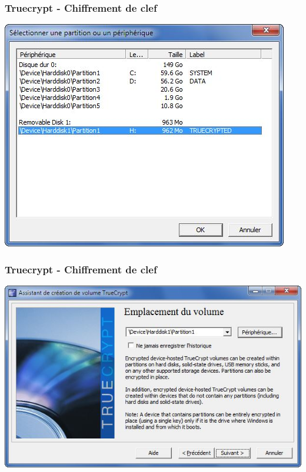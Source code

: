 \documentclass{beamer}
\begin{document}
\begin{frame}
\frametitle{Truecrypt - Chiffrement de clef}
\begin{center}
\includegraphics[scale=0.5] {./images/Truecrypt26.jpg} 
\end{center}
\end{frame}
\begin{frame}
\frametitle{Truecrypt - Chiffrement de clef}
\begin{center}
\includegraphics[scale=0.5] {./images/Truecrypt27.jpg} 
\end{center}
\end{frame}
\end{document}
